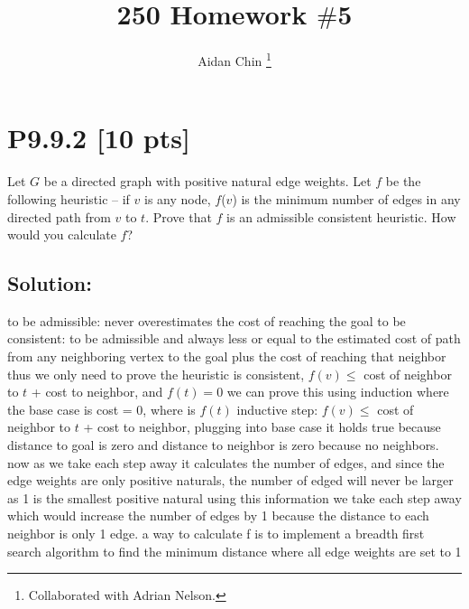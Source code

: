\documentclass[12pt]{article}
\title{250 Homework $\#$5}
\author{Aidan Chin \footnote{Collaborated with Adrian Nelson.}}
\begin{document}
\maketitle

\section*{\textbf{P9.9.2} [10 pts]}
Let $G$ be a directed graph with positive natural edge weights. Let $f$ be the following heuristic – if $v$ is any node, $f$($v$) is the minimum number of edges in any directed path from $v$ to $t$. Prove that $f$ is an admissible consistent heuristic. How would you calculate $f$?

\subsection*{\textbf{Solution:}}
to be admissible: never overestimates the cost of reaching the goal\newline
to be consistent: to be admissible and always less or equal to the estimated cost of path from any neighboring vertex to the goal plus the cost of reaching that neighbor\newline
thus we only need to prove the heuristic is consistent, $f(v)\le$ cost of neighbor to $t$ + cost to neighbor, and $f(t) = 0$ \newline
we can prove this using induction where the base case is cost = 0, where is $f(t)$ \newline
inductive step: $f(v)\le$ cost of neighbor to $t$ + cost to neighbor, plugging into base case it holds true because distance to goal is zero and distance to neighbor is zero because no neighbors.\newline
now as we take each step away it calculates the number of edges, and since the edge weights are only positive naturals, the number of edged will never be larger as 1 is the smallest positive natural\newline
using this information we take each step away which would increase the number of edges by 1 because the distance to each neighbor is only 1 edge. 
a way to calculate f is to implement a breadth first search algorithm to find the minimum distance where all edge weights are set to 1


\newpage
\end{document}
